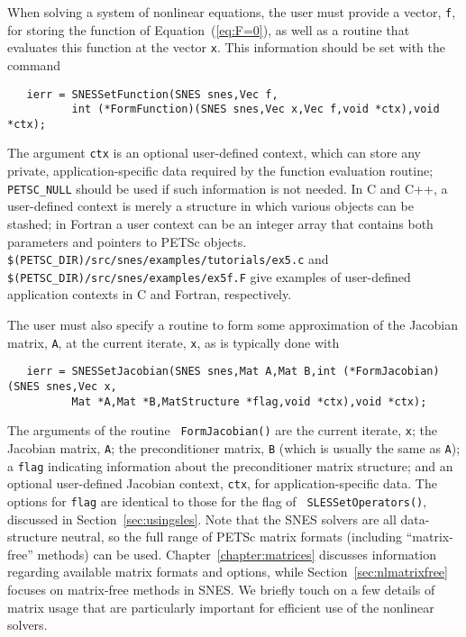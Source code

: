 When solving a system of nonlinear equations, the user must provide
a vector, {\tt f}, for storing the function of
Equation~(\ref{eq:F=0}), as well as a routine that evaluates this
function at the vector {\tt x}.  This information should be set with
the command 
\begin{verbatim}
   ierr = SNESSetFunction(SNES snes,Vec f,
          int (*FormFunction)(SNES snes,Vec x,Vec f,void *ctx),void *ctx);
\end{verbatim}
The argument {\tt ctx} is an optional user-defined context, which can
store any private, application-specific data required by the
function evaluation routine; {\tt PETSC\_NULL} should be used if such information
is not needed.  In C and C++, a user-defined context is merely a
structure in which various objects can be stashed; in Fortran a user
context can be an integer array that contains both parameters and
pointers to PETSc objects. {\tt \$(PETSC\_DIR)/src/snes/examples/tutorials/ex5.c} and
{\tt \$(PETSC\_DIR)/src/snes/examples/ex5f.F} give examples of user-defined
application contexts in C and Fortran, respectively.

The user must also specify a routine to form some approximation of the
Jacobian matrix, {\tt A}, at the current iterate, {\tt x},
as is typically done with
\begin{verbatim}
   ierr = SNESSetJacobian(SNES snes,Mat A,Mat B,int (*FormJacobian)(SNES snes,Vec x,
          Mat *A,Mat *B,MatStructure *flag,void *ctx),void *ctx);
\end{verbatim}
The  arguments of the routine {\tt
FormJacobian()} are the current iterate, {\tt x}; the Jacobian matrix,
{\tt A}; the preconditioner matrix, {\tt B} (which is usually the same
as {\tt A}); a {\tt flag} indicating information about the
preconditioner matrix structure; and an optional user-defined Jacobian
context, {\tt ctx}, for application-specific data.  The options for
{\tt flag} are identical to those for the flag of {\tt
SLESSetOperators()}, discussed in Section~\ref{sec:usingsles}.  
Note that the SNES solvers are all data-structure neutral, so the full
range of PETSc matrix formats (including ``matrix-free''
methods) can be used.  Chapter~\ref{chapter:matrices} discusses
information regarding available matrix formats and options, while
Section~\ref{sec:nlmatrixfree} focuses on matrix-free
methods in SNES. We briefly touch on a few details of matrix usage that are
particularly important for efficient use of the nonlinear solvers.

